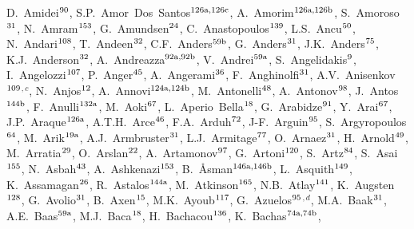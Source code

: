 \begin{flushleft}
D.~Amidei$^\textrm{\scriptsize 90}$,
S.P.~Amor~Dos~Santos$^\textrm{\scriptsize 126a,126c}$,
A.~Amorim$^\textrm{\scriptsize 126a,126b}$,
S.~Amoroso$^\textrm{\scriptsize 31}$,
N.~Amram$^\textrm{\scriptsize 153}$,
G.~Amundsen$^\textrm{\scriptsize 24}$,
C.~Anastopoulos$^\textrm{\scriptsize 139}$,
L.S.~Ancu$^\textrm{\scriptsize 50}$,
N.~Andari$^\textrm{\scriptsize 108}$,
T.~Andeen$^\textrm{\scriptsize 32}$,
C.F.~Anders$^\textrm{\scriptsize 59b}$,
G.~Anders$^\textrm{\scriptsize 31}$,
J.K.~Anders$^\textrm{\scriptsize 75}$,
K.J.~Anderson$^\textrm{\scriptsize 32}$,
A.~Andreazza$^\textrm{\scriptsize 92a,92b}$,
V.~Andrei$^\textrm{\scriptsize 59a}$,
S.~Angelidakis$^\textrm{\scriptsize 9}$,
I.~Angelozzi$^\textrm{\scriptsize 107}$,
P.~Anger$^\textrm{\scriptsize 45}$,
A.~Angerami$^\textrm{\scriptsize 36}$,
F.~Anghinolfi$^\textrm{\scriptsize 31}$,
A.V.~Anisenkov$^\textrm{\scriptsize 109}$$^{,c}$,
N.~Anjos$^\textrm{\scriptsize 12}$,
A.~Annovi$^\textrm{\scriptsize 124a,124b}$,
M.~Antonelli$^\textrm{\scriptsize 48}$,
A.~Antonov$^\textrm{\scriptsize 98}$,
J.~Antos$^\textrm{\scriptsize 144b}$,
F.~Anulli$^\textrm{\scriptsize 132a}$,
M.~Aoki$^\textrm{\scriptsize 67}$,
L.~Aperio~Bella$^\textrm{\scriptsize 18}$,
G.~Arabidze$^\textrm{\scriptsize 91}$,
Y.~Arai$^\textrm{\scriptsize 67}$,
J.P.~Araque$^\textrm{\scriptsize 126a}$,
A.T.H.~Arce$^\textrm{\scriptsize 46}$,
F.A.~Arduh$^\textrm{\scriptsize 72}$,
J-F.~Arguin$^\textrm{\scriptsize 95}$,
S.~Argyropoulos$^\textrm{\scriptsize 64}$,
M.~Arik$^\textrm{\scriptsize 19a}$,
A.J.~Armbruster$^\textrm{\scriptsize 31}$,
L.J.~Armitage$^\textrm{\scriptsize 77}$,
O.~Arnaez$^\textrm{\scriptsize 31}$,
H.~Arnold$^\textrm{\scriptsize 49}$,
M.~Arratia$^\textrm{\scriptsize 29}$,
O.~Arslan$^\textrm{\scriptsize 22}$,
A.~Artamonov$^\textrm{\scriptsize 97}$,
G.~Artoni$^\textrm{\scriptsize 120}$,
S.~Artz$^\textrm{\scriptsize 84}$,
S.~Asai$^\textrm{\scriptsize 155}$,
N.~Asbah$^\textrm{\scriptsize 43}$,
A.~Ashkenazi$^\textrm{\scriptsize 153}$,
B.~{\AA}sman$^\textrm{\scriptsize 146a,146b}$,
L.~Asquith$^\textrm{\scriptsize 149}$,
K.~Assamagan$^\textrm{\scriptsize 26}$,
R.~Astalos$^\textrm{\scriptsize 144a}$,
M.~Atkinson$^\textrm{\scriptsize 165}$,
N.B.~Atlay$^\textrm{\scriptsize 141}$,
K.~Augsten$^\textrm{\scriptsize 128}$,
G.~Avolio$^\textrm{\scriptsize 31}$,
B.~Axen$^\textrm{\scriptsize 15}$,
M.K.~Ayoub$^\textrm{\scriptsize 117}$,
G.~Azuelos$^\textrm{\scriptsize 95}$$^{,d}$,
M.A.~Baak$^\textrm{\scriptsize 31}$,
A.E.~Baas$^\textrm{\scriptsize 59a}$,
M.J.~Baca$^\textrm{\scriptsize 18}$,
H.~Bachacou$^\textrm{\scriptsize 136}$,
K.~Bachas$^\textrm{\scriptsize 74a,74b}$,

\end{flushleft}
